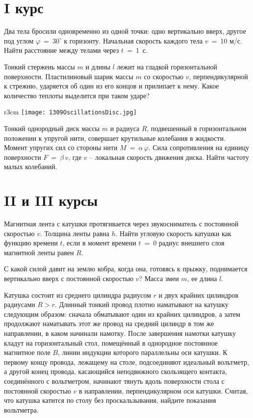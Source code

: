 \section{I курс}

\AddProb Два тела бросили одновременно из одной точки: одно вертикально вверх, другое под углом $\varphi~=~30^{\circ}$ к горизонту. 
Начальная скорость каждого тела $v$~=~10 м/с. Найти расстояние между телами через $t$~=~1~с.

\AddProb Тонкий стержень массы $m$ и длины $l$ лежит на гладкой горизонтальной поверхности. Пластилиновый шарик массы $m$ со скоростью $v$, 
перпендикулярной к стрежню, ударяется об один из его концов и прилипает к нему. Какое количество теплоты выделится при таком ударе?

\begin{wrapfigure}{r}{3cm}
\texttt{[image: 1309OscillationsDisc.jpg]}
\end{wrapfigure}

\AddProb Тонкий однородный диск массы $m$ и радиуса $R$, подвешенный в горизонтальном положении к упругой нити, совершает крутильные колебания в жидкости. 
Момент упругих сил со стороны нити $M~=~\alpha\,\varphi$.  Сила сопротивления на единицу поверхности $F~=~\beta\,v$, где $v$ -- локальная скорость 
движения диска. Найти частоту малых колебаний.


\section{II и III курсы}

\AddProb Магнитная лента с катушки протягивается через звукосниматель с постоянной скоростью $v$. Толщина ленты равна $h$. 
Найти угловую скорость катушки как функцию времени $t$, если в момент времени $t$~=~0 радиус внешнего слоя магнитной ленты равен $R$.

\AddProb С какой силой давит на землю кобра, когда она, готовясь к прыжку, поднимается вертикально вверх с постоянной скоростью $v$? 
Масса змеи $m$, ее длина $l$.

\AddProb Катушка состоит из среднего цилиндра радиусом $r$ и двух крайних цилиндров радиусами $R > r$. Длинный тонкий провод плотно наматывают на катушку 
следующим образом: сначала обматывают один из крайних цилиндров, а затем продолжают наматывать этот же провод на средний цилиндр в том же 
направлении, в каком начинали намотку. После завершения намотки катушку кладут на горизонтальный стол, помещённый в однородное постоянное магнитное поле $B$, 
линии индукции которого параллельны оси катушки. К первому концу провода, лежащему на столе, подсоединяют идеальный вольтметр, а другой конец провода, 
касающийся неподвижного скользящего контакта, соединённого с вольтметром, начинают тянуть вдоль поверхности стола с постоянной скоростью $v$ в направлении, 
перпендикулярном оси катушки. Считая, что катушка катится по столу без проскальзывания, найдите показания вольтметра.